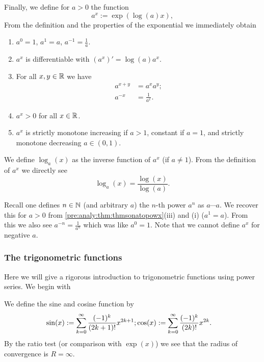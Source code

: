 \documentclass[10pt, a4paper]{article}
\begin{document}
Finally,
we define for $a > 0$ the function
\[
a ^ x := \exp(\log(a)x),
\]
From the definition and the properties of the exponential we immediately obtain
\begin{theorem}\label{pre:analy:thm:thmsonatopowx}
    \begin{enumerate}[label = (\roman*)]
        \item $a ^ 0 = 1$,
        $a ^ 1 = a$,
        $a ^ {-1} = \frac{1}{a}$.
        
        \item $a ^ x$ is differentiable with $(a ^ x)' = \log(a)a ^ x$.

        \item For all $x, y \in \mathbb{R}$ we have
        \begin{align*}
            a ^ {x + y} &= a ^ xa ^ y; \\
            a ^ {-x} &= \frac{1}{a ^ x}.
        \end{align*}
        
        \item $a ^ x > 0$ for all $x \in \mathbb{R}$.

        \item $a ^ x$ is strictly monotone increasing if $a > 1$,
        constant if $a = 1$,
        and strictly monotone decreasing $a \in (0, 1)$.
    \end{enumerate}
\end{theorem}

We define $\log_a(x)$ as the inverse function of $a ^ x$
(if $a \neq 1$).
From the definition of $a ^ x$ we directly see
\[
\log_a(x) = \frac{\log(x)}{\log(a)}.
\]
\begin{remark}
    Recall one defines $n \in \mathbb{N}$
    (and arbitrary $a$)
    the $n$-th power $a ^ n$ as $a \dotsi a$.
    We recover this for $a > 0$ from \autoref{pre:analy:thm:thmsonatopowx}(iii) and (i)
    ($a ^ 1 = a$).
    From this we also see $a ^ {-n} = \frac{1}{a ^ n}$ which was like $a ^ 0 = 1$.
    Note that we cannot define $a ^ x$ for negative $a$.
\end{remark}

\subsubsection{The trigonometric functions}

Here we will give a rigorous introduction to trigonometric functions using power series.
We begin with
\begin{definition}
    We define the sine and cosine function by
    \begin{align*}
        \sin(x) := \sum_{k = 0}^{\infty}\frac{(-1) ^ k}{(2k + 1)!}x ^ {2k + 1};&\cos(x) := \sum_{k = 0}^{\infty}\frac{(-1) ^ k}{(2k)!}x ^ {2k}.
    \end{align*}
    By the ratio test
    (or comparison with $\exp(x)$)
    we see that the radius of convergence is $R = \infty$.
\end{definition}
\end{document}
